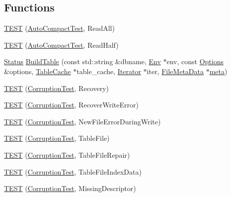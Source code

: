 \subsection*{Functions}
\begin{DoxyCompactItemize}
\item 
\hyperlink{namespaceleveldb_a9c4f7d5038dfc2985100b60ae2549fde}{T\+E\+S\+T} (\hyperlink{classleveldb_1_1_auto_compact_test}{Auto\+Compact\+Test}, Read\+All)
\item 
\hyperlink{namespaceleveldb_a404a4db88f6b45942b1945a996858a62}{T\+E\+S\+T} (\hyperlink{classleveldb_1_1_auto_compact_test}{Auto\+Compact\+Test}, Read\+Half)
\item 
\hyperlink{classleveldb_1_1_status}{Status} \hyperlink{namespaceleveldb_a10e102da98819e1a1f9b254241482e65}{Build\+Table} (const std\+::string \&dbname, \hyperlink{classleveldb_1_1_env}{Env} $\ast$env, const \hyperlink{structleveldb_1_1_options}{Options} \&options, \hyperlink{classleveldb_1_1_table_cache}{Table\+Cache} $\ast$table\+\_\+cache, \hyperlink{classleveldb_1_1_iterator}{Iterator} $\ast$iter, \hyperlink{structleveldb_1_1_file_meta_data}{File\+Meta\+Data} $\ast$\hyperlink{repair_8cc_a6b8f1f5fc8f36aa1678fff8fa5aecd0b}{meta})
\item 
\hyperlink{namespaceleveldb_a46326658ffc04dd7509c4066082edb1f}{T\+E\+S\+T} (\hyperlink{classleveldb_1_1_corruption_test}{Corruption\+Test}, Recovery)
\item 
\hyperlink{namespaceleveldb_a22ecc0fbc7435947076320655c5e0265}{T\+E\+S\+T} (\hyperlink{classleveldb_1_1_corruption_test}{Corruption\+Test}, Recover\+Write\+Error)
\item 
\hyperlink{namespaceleveldb_a25dbda5a48ec782778d331e4ccb81b6b}{T\+E\+S\+T} (\hyperlink{classleveldb_1_1_corruption_test}{Corruption\+Test}, New\+File\+Error\+During\+Write)
\item 
\hyperlink{namespaceleveldb_a1da99cee14629599882010198aabfa2a}{T\+E\+S\+T} (\hyperlink{classleveldb_1_1_corruption_test}{Corruption\+Test}, Table\+File)
\item 
\hyperlink{namespaceleveldb_a9f03547489b40b6e76cd8fc8a116884a}{T\+E\+S\+T} (\hyperlink{classleveldb_1_1_corruption_test}{Corruption\+Test}, Table\+File\+Repair)
\item 
\hyperlink{namespaceleveldb_acdfa0365a941e8e01531a402e53ad325}{T\+E\+S\+T} (\hyperlink{classleveldb_1_1_corruption_test}{Corruption\+Test}, Table\+File\+Index\+Data)
\item 
\hyperlink{namespaceleveldb_a6214e0d0ebfaf716601f7a9571aa09ca}{T\+E\+S\+T} (\hyperlink{classleveldb_1_1_corruption_test}{Corruption\+Test}, Missing\+Descriptor)

\end{DoxyCompactItemize}
